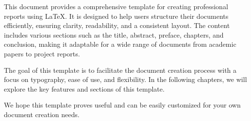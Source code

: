 

This document provides a comprehensive template for creating professional reports using LaTeX. It is designed to help users structure their documents efficiently, ensuring clarity, readability, and a consistent layout. The content includes various sections such as the title, abstract, preface, chapters, and conclusion, making it adaptable for a wide range of documents from academic papers to project reports.

The goal of this template is to facilitate the document creation process with a focus on typography, ease of use, and flexibility. In the following chapters, we will explore the key features and sections of this template.

We hope this template proves useful and can be easily customized for your own document creation needs.



